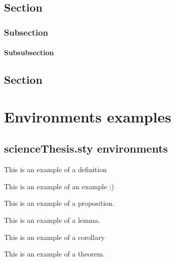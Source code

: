 \lipsum[2]

\section{Section}

\lipsum[1-4]

\subsection{Subsection}

\lipsum[1]

\subsubsection{Subsubsection}

\lipsum[1-3]

\section{Section}

\lipsum[1-2]

\chapter{Environments examples}

\section{scienceThesis.sty environments}

\begin{definition}
This is an example of a definition
\end{definition}

\begin{example}
This is an example of an example :)
\end{example}

\begin{proposition}
This is an example of a proposition.
\end{proposition}

\begin{lemma}
This is an example of a lemma.
\end{lemma}

\begin{corollary}
This is an example of a corollary
\end{corollary}

\begin{theorem}
This is an example of a theorem.
\end{theorem}

